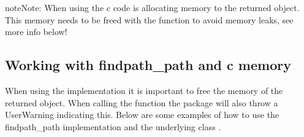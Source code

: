 \documentclass[letterpaper,10pt,english]{sphinxmanual}
\begin{document}
\begin{sphinxadmonition}{note}{Note:}
\sphinxAtStartPar
When using  the c code is allocating memory to the returned object.
This memory needs to be freed with the  function to avoid memory leaks, see more info below!
\end{sphinxadmonition}


\subsection{Working with findpath\_path and c memory}
\label{\detokenize{trees:working-with-findpath-path-and-c-memory}}
\sphinxAtStartPar
When using the  implementation it is important to free the memory of the
returned  object. When calling the function the package will also throw a UserWarning indicating this.
Below are some examples of how to use the findpath\_path implementation and the underlying class .
\end{document}
